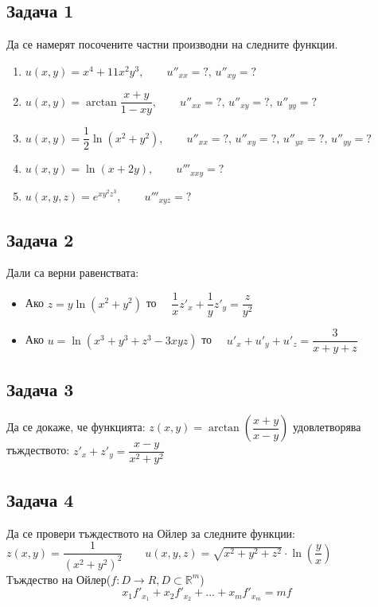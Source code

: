 \documentclass[a4paper,fleqn,12pt]{article}
\theoremstyle{definition}
\begin{document}
\subsection*{Задача 1}
Да се намерят посочените частни производни на следните функции.\\
\begin{enumerate}
\item $u(x,y) = x^4 + 11x^2y^3, \qquad u''_{xx} = ?,\, u''_{xy} = ?$ 
\item $u(x,y) = \arctan{\dfrac{x+y}{1-xy}}, \qquad u''_{xx} = ?,\, u''_{xy} = ?,\,u''_{yy} = ?$
\item $u(x,y) = \dfrac{1}{2} \ln{(x^2 + y^2)}, \qquad u''_{xx} = ?,\, u''_{xy} = ?,\,u''_{yx} = ?,\,u''_{yy} = ?$
\item $u(x,y) = \ln{(x + 2y)}, \qquad u'''_{xxy} = ?$
\item $u(x,y,z) = e^{xy^2z^3}, \qquad u'''_{xyz} = ?$
\end{enumerate}

\subsection*{Задача 2}
Дали са верни равенствата: \\
\begin{itemize}
\item Ако $z = y\ln{(x^2+y^2)}$ то $\quad \dfrac{1}{x} z'_x + \dfrac{1}{y} z'_y = \dfrac{z}{y^2}$
\item Ако $u = \ln{(x^3+y^3 + z^3 - 3xyz)} $ то $ \quad u'_x + u'_y + u'_z = \dfrac{3}{x+y+z}$
\end{itemize}

\subsection*{Задача 3}
Да се докаже, че функцията: $z(x,y) = \arctan{\left( \dfrac{x+y}{x-y} \right)}$ удовлетворява тъждеството: $z'_x + z'_y = \dfrac{x-y}{x^2 + y^2}$

\subsection*{Задача 4}
Да се провери тъждеството на Ойлер за следните функции:
$z(x,y) = \dfrac{1}{(x^2+y^2)^2}\qquad u(x,y,z) = \sqrt{x^2+y^2+z^2}\cdot \ln{\left( \dfrac{y}{x}\right)}$\\
Тъждество на Ойлер($f:D \to R, D\subset \mathbb{R}^m$)
$$x_1f'_{x_1} + x_2f'_{x_2} + ... +x_mf'_{x_m} = mf$$
\end{document}
